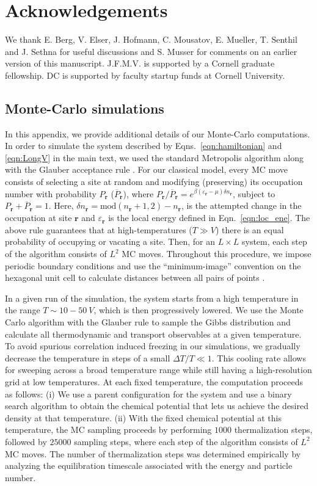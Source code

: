 \documentclass[aps,prx,onecolumn,amsmath,nofootinbib,amssymb,11pt]{revtex4-1}
\renewcommand{\vec}[1]{\boldsymbol{#1}}
\def \r {{\vec r}}
\begin{document}
{\section*{\textsf{Acknowledgements}}
We thank E. Berg, V. Elser, J. Hofmann, C. Mousatov, E. Mueller, T. Senthil and J. Sethna for useful discussions and S. Musser for comments on an earlier version of this manuscript. J.F.M.V. is supported by a Cornell graduate fellowship. DC is supported by faculty startup funds at Cornell University.


\begin{appendix}

\section{\textsf{Monte-Carlo simulations}}
\label{ap:MC}
In this appendix, we provide additional details of our Monte-Carlo computations. In order to simulate the system described by Eqns.~\ref{eqn:hamiltonian} and \ref{eqn:LongV} in the main text, we used the standard Metropolis algorithm along with the Glauber acceptance rule \cite{Glauber}. For our classical model, every MC move consists of selecting a site at random and modifying (preserving) its occupation number with probability $P_\r$ ($\overline{P}_\r$), where $P_\r/\overline{P}_\r = e^{\beta \left( \varepsilon_\r -\mu \right) \delta n_\r  }$, subject to $P_\r+\overline{P}_\r = 1$. Here, $\delta n_\r=\text{mod} \left(n_\r +1,2 \right) -n_\r$, is the attempted change in the occupation at site $\r$ and $\varepsilon_\r $ is the local energy defined in Eqn.~\ref{eqn:loc_ene}. The above rule guarantees that at high-temperatures ($T\gg V$) there is an equal probability of occupying or vacating a site. Then, for an $L\times L$ system, each step of the algorithm  consists of $L^2$ MC moves.  Throughout this procedure, we impose periodic boundary conditions and use the ``minimum-image'' convention on the hexagonal unit cell to calculate distances between all pairs of points \cite{SimulationLiq}.

In a given run of the simulation, the system starts from a high temperature in the range $T\sim 10-50~V$, which is then progressively lowered. We use the Monte Carlo algorithm with the Glauber rule to sample the Gibbs distribution and calculate all thermodynamic and transport observables at a given temperature. To avoid spurious correlation induced freezing in our simulations, we gradually decrease the temperature in steps of a small $\Delta T/T\ll 1$. This cooling rate allows for sweeping across a broad temperature range while still having a high-resolution grid at low temperatures. At each fixed temperature, the computation proceeds as follows: (i) We use a parent configuration for the system and  use a binary search algorithm to obtain the chemical potential that lets us achieve the desired density at that temperature. (ii) With the fixed chemical potential at this temperature, the MC sampling proceeds by performing $1000$ thermalization steps, followed by $25000$ sampling steps, where each step of the algorithm  consists of $L^2$ MC moves. The number of thermalization steps was determined empirically by analyzing the equilibration timescale associated with the energy and particle number.


\end{appendix}}
\end{document}
